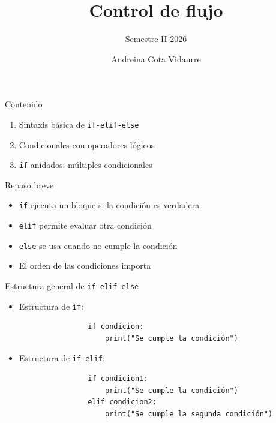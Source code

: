 \documentclass{beamer}
\title{Control de flujo} %
\subtitle{Semestre II-2026} %
\author{Andreina Cota Vidaurre}
\begin{document}
  \shorthandoff{-}
  \frame[c]{\maketitle}


    \begin{frame}[fragile,t]{Contenido}
        \begin{enumerate}
            \item Sintaxis básica de \texttt{if-elif-else}
            \item Condicionales con operadores lógicos
            \item \texttt{if} anidados: múltiples condicionales
        \end{enumerate}
    \end{frame}

    \begin{frame}{Repaso breve}
        \begin{itemize}
            \item \texttt{if} ejecuta un bloque si la condición es verdadera
            \item \texttt{elif} permite evaluar otra condición
            \item \texttt{else} se usa cuando no cumple la condición
            \item El orden de las condiciones importa
        \end{itemize}
    \end{frame}

    \begin{frame}[fragile,t]{Estructura general de \texttt{if-elif-else}}
        \begin{itemize}
            \item Estructura de \texttt{if}:
            \begin{verbatim}
                if condicion:
                    print("Se cumple la condición")
            \end{verbatim}
            \item Estructura de \texttt{if-elif}:
            \begin{verbatim}   
                if condicion1:
                    print("Se cumple la condición")
                elif condicion2:
                    print("Se cumple la segunda condición")
            \end{verbatim}
        \end{itemize}
    \end{frame}
\end{document}
